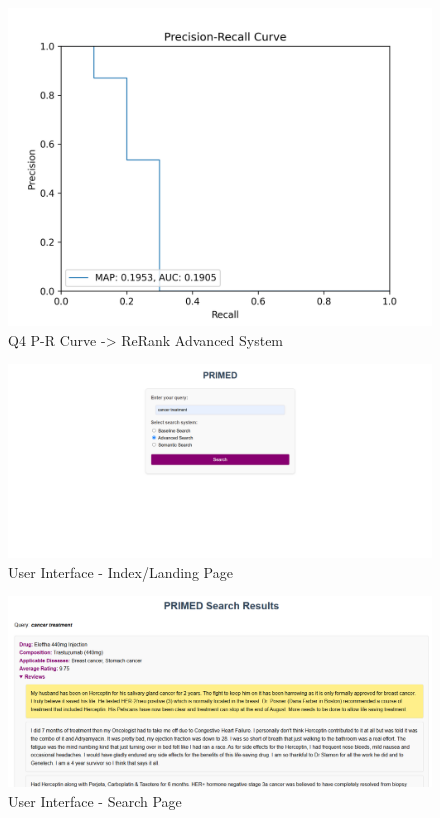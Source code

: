 \documentclass[sigconf]{acmart}
\begin{document}
\begin{figure}[H]
  \centering
  \includegraphics[width=0.8\linewidth]{precision_recall_q4r.png}
  \caption{Q4 P-R Curve -> ReRank Advanced System}
  \label{fig:precisionRecallReRank4}
\end{figure}

\begin{figure}[H]
  \centering
  \includegraphics[width=0.8\linewidth]{indexUI.png}
  \caption{User Interface - Index/Landing Page}
  \label{fig:indexUI}
\end{figure}

\begin{figure}[H]
  \centering
  \includegraphics[width=0.8\linewidth]{searchUI.png}
  \caption{User Interface - Search Page}
  \label{fig:searchUI}
\end{figure}

\end{document}
